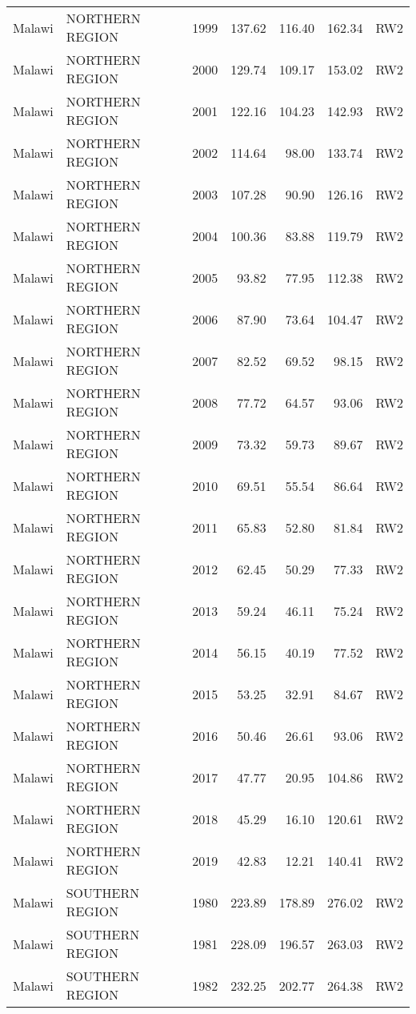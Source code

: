 \begin{longtable}{lllrrrl}
  Malawi & NORTHERN REGION & 1999 & 137.62 & 116.40 & 162.34 & RW2 \\ 
  Malawi & NORTHERN REGION & 2000 & 129.74 & 109.17 & 153.02 & RW2 \\ 
  Malawi & NORTHERN REGION & 2001 & 122.16 & 104.23 & 142.93 & RW2 \\ 
  Malawi & NORTHERN REGION & 2002 & 114.64 & 98.00 & 133.74 & RW2 \\ 
  Malawi & NORTHERN REGION & 2003 & 107.28 & 90.90 & 126.16 & RW2 \\ 
  Malawi & NORTHERN REGION & 2004 & 100.36 & 83.88 & 119.79 & RW2 \\ 
  Malawi & NORTHERN REGION & 2005 & 93.82 & 77.95 & 112.38 & RW2 \\ 
  Malawi & NORTHERN REGION & 2006 & 87.90 & 73.64 & 104.47 & RW2 \\ 
  Malawi & NORTHERN REGION & 2007 & 82.52 & 69.52 & 98.15 & RW2 \\ 
  Malawi & NORTHERN REGION & 2008 & 77.72 & 64.57 & 93.06 & RW2 \\ 
  Malawi & NORTHERN REGION & 2009 & 73.32 & 59.73 & 89.67 & RW2 \\ 
  Malawi & NORTHERN REGION & 2010 & 69.51 & 55.54 & 86.64 & RW2 \\ 
  Malawi & NORTHERN REGION & 2011 & 65.83 & 52.80 & 81.84 & RW2 \\ 
  Malawi & NORTHERN REGION & 2012 & 62.45 & 50.29 & 77.33 & RW2 \\ 
  Malawi & NORTHERN REGION & 2013 & 59.24 & 46.11 & 75.24 & RW2 \\ 
  Malawi & NORTHERN REGION & 2014 & 56.15 & 40.19 & 77.52 & RW2 \\ 
  Malawi & NORTHERN REGION & 2015 & 53.25 & 32.91 & 84.67 & RW2 \\ 
  Malawi & NORTHERN REGION & 2016 & 50.46 & 26.61 & 93.06 & RW2 \\ 
  Malawi & NORTHERN REGION & 2017 & 47.77 & 20.95 & 104.86 & RW2 \\ 
  Malawi & NORTHERN REGION & 2018 & 45.29 & 16.10 & 120.61 & RW2 \\ 
  Malawi & NORTHERN REGION & 2019 & 42.83 & 12.21 & 140.41 & RW2 \\ 
  Malawi & SOUTHERN REGION & 1980 & 223.89 & 178.89 & 276.02 & RW2 \\ 
  Malawi & SOUTHERN REGION & 1981 & 228.09 & 196.57 & 263.03 & RW2 \\ 
  Malawi & SOUTHERN REGION & 1982 & 232.25 & 202.77 & 264.38 & RW2 \\ 

\end{longtable}
